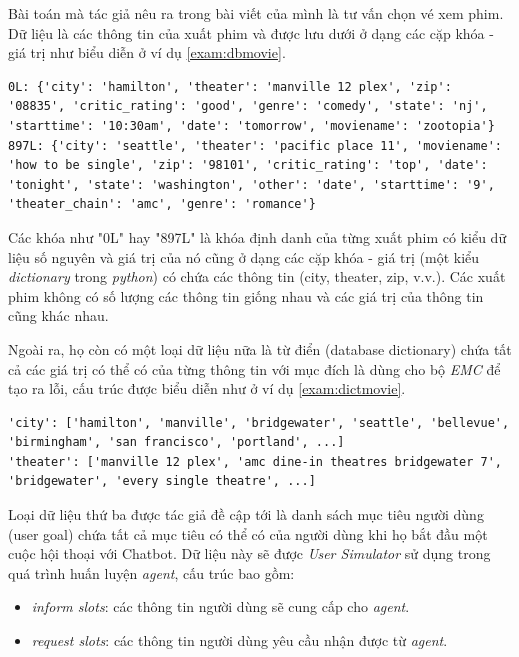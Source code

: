 Bài toán mà tác giả nêu ra trong bài viết của mình là tư vấn chọn vé xem phim. Dữ liệu là các thông tin của xuất phim và được lưu dưới ở dạng các cặp khóa - giá trị như biểu diễn ở ví dụ \ref{exam:dbmovie}.

\renewcommand{\lstlistingname}{Ví dụ}
\begin{lstlisting}[caption={Dữ liệu thông tin của các xuất phim},label={exam:dbmovie},language=code_en,firstnumber=1]
0L: {'city': 'hamilton', 'theater': 'manville 12 plex', 'zip': '08835', 'critic_rating': 'good', 'genre': 'comedy', 'state': 'nj', 'starttime': '10:30am', 'date': 'tomorrow', 'moviename': 'zootopia'}
897L: {'city': 'seattle', 'theater': 'pacific place 11', 'moviename': 'how to be single', 'zip': '98101', 'critic_rating': 'top', 'date': 'tonight', 'state': 'washington', 'other': 'date', 'starttime': '9', 'theater_chain': 'amc', 'genre': 'romance'}
\end{lstlisting}

Các khóa như "0L" hay "897L" là khóa định danh của từng xuất phim có kiểu dữ liệu số nguyên và giá trị của nó cũng ở dạng các cặp khóa - giá trị (một kiểu \textit{dictionary} trong \textit{python}) có chứa các thông tin (city, theater, zip, v.v.). Các xuất phim không có số lượng các thông tin giống nhau và các giá trị của thông tin cũng khác nhau.

Ngoài ra, họ còn có một loại dữ liệu nữa là từ điển (database dictionary) chứa tất cả các giá trị có thể có của từng thông tin với mục đích là dùng cho bộ \textit{EMC} để tạo ra lỗi, cấu trúc được biểu diễn như ở ví dụ \ref{exam:dictmovie}.

\renewcommand{\lstlistingname}{Ví dụ}
\begin{lstlisting}[caption={Từ điển của các thông tin xuất phim},label={exam:dictmovie},language=code_en,firstnumber=1]
'city': ['hamilton', 'manville', 'bridgewater', 'seattle', 'bellevue', 'birmingham', 'san francisco', 'portland', ...]
'theater': ['manville 12 plex', 'amc dine-in theatres bridgewater 7', 'bridgewater', 'every single theatre', ...]
\end{lstlisting}

Loại dữ liệu thứ ba được tác giả đề cập tới là danh sách mục tiêu người dùng (user goal) chứa tất cả mục tiêu có thể có của người dùng khi họ bắt đầu một cuộc hội thoại với Chatbot. Dữ liệu này sẽ được \textit{User Simulator} sử dụng trong quá trình huấn luyện \textit{agent}, cấu trúc bao gồm:

\begin{itemize}
    \item \textit{inform slots}: các thông tin người dùng sẽ cung cấp cho \textit{agent}.
    \item \textit{request slots}: các thông tin người dùng yêu cầu nhận được từ \textit{agent}.
\end{itemize}

